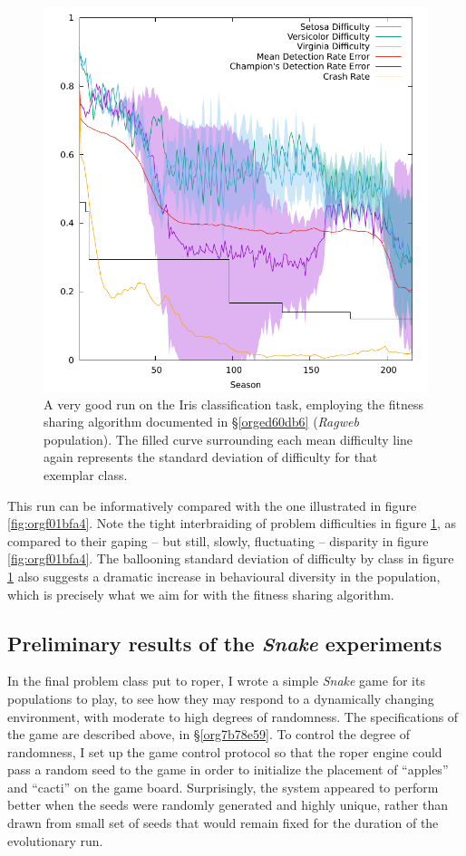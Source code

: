 \documentclass[12pt,glossary]{dalthesis}
\begin{document}
\begin{figure}[htbp]
\centering
\includegraphics[width=.9\linewidth]{../images/plots/sharing.pdf}
\caption{\label{fig:org45e078d}
A very good run on the Iris classification task, employing the fitness sharing algorithm documented in \S \ref{orged60db6} (\emph{Ragweb} population). The filled curve surrounding each mean difficulty line again represents the standard deviation of difficulty for that exemplar class.}
\end{figure}



This run can be informatively compared with the one illustrated in figure
\ref{fig:orgf01bfa4}. Note the tight interbraiding of problem difficulties in
figure \ref{fig:org45e078d}, as compared to their gaping -- but still, slowly,
fluctuating -- disparity in figure \ref{fig:orgf01bfa4}. The ballooning standard
deviation of difficulty by class in figure \ref{fig:org45e078d} also suggests
a dramatic increase in behavioural diversity in the population, which is
precisely what we aim for with the fitness sharing algorithm.


\subsection{Preliminary results of the \emph{Snake} experiments}
\label{sec:orga082a54}
\label{org9e547ab}

In the final problem class put to \gls{roper}, I wrote a simple \emph{Snake} game
\cite{snakefight} for its populations to play, to see how they may respond to a
dynamically changing environment, with moderate to high degrees of randomness.
The specifications of the game are described above, in \S \ref{org7b78e59}.
To control the degree of randomness, I set up the game control protocol so that
the \gls{roper} engine could pass a random seed to the game in order to initialize
the placement of ``apples'' and ``cacti'' on the game board. Surprisingly, the 
system appeared to perform better when the seeds were randomly generated and
highly unique, rather than drawn from small set of seeds that would remain fixed
for the duration of the evolutionary run. 
\end{document}
